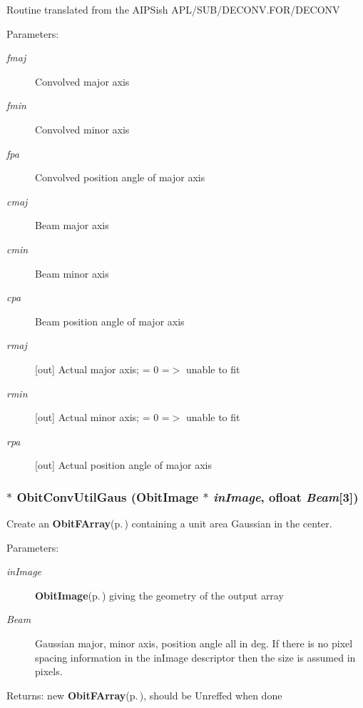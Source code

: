 Routine translated from the AIPSish APL/SUB/DECONV.FOR/DECONV \begin{Desc}
\item[Parameters:]
\begin{description}
\item[{\em fmaj}]Convolved major axis \item[{\em fmin}]Convolved minor axis \item[{\em fpa}]Convolved position angle of major axis \item[{\em cmaj}]Beam major axis \item[{\em cmin}]Beam minor axis \item[{\em cpa}]Beam position angle of major axis \item[{\em rmaj}][out] Actual major axis; = 0 =$>$ unable to fit \item[{\em rmin}][out] Actual minor axis; = 0 =$>$ unable to fit \item[{\em rpa}][out] Actual position angle of major axis \end{description}
\end{Desc}
\subsubsection{$\ast$ Obit\-Conv\-Util\-Gaus ({\bf Obit\-Image} $\ast$ {\em in\-Image}, {\bf ofloat} {\em Beam}[3])}\label{ObitConvUtil_8c_a2}


Create an {\bf Obit\-FArray}{\rm (p.\,\pageref{structObitFArray})} containing a unit area Gaussian in the center. 

\begin{Desc}
\item[Parameters:]
\begin{description}
\item[{\em in\-Image}]{\bf Obit\-Image}{\rm (p.\,\pageref{structObitImage})} giving the geometry of the output array \item[{\em Beam}]Gaussian major, minor axis, position angle all in deg. If there is no pixel spacing information in the in\-Image descriptor then the size is assumed in pixels. \end{description}
\end{Desc}
\begin{Desc}
\item[Returns:]new {\bf Obit\-FArray}{\rm (p.\,\pageref{structObitFArray})}, should be Unreffed when done \end{Desc}
